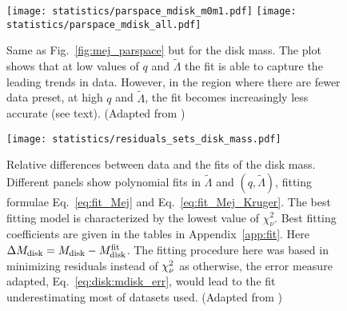 \begin{figure}[t]
    \centering 
    \texttt{[image: statistics/parspace\_mdisk\_m0m1.pdf]}
    \texttt{[image: statistics/parspace\_mdisk\_all.pdf]}
    \caption{
        Same as Fig.~\ref{fig:mej_parspace} but for the disk mass.
        The plot shows that at low values of $q$ and $\tilde{\Lambda}$ the fit 
        is able to capture the leading trends in data. However, in the region where 
        there are fewer data preset, at high $q$ and $\tilde{\Lambda}$, the fit 
        becomes increasingly less accurate (see text).
        (Adapted from \citet{Nedora:2020qtd})
    }
    \label{fig:mdisk_parspace}
\end{figure}
%
\begin{figure}[t]
    \centering 
    \texttt{[image: statistics/residuals\_sets\_disk\_mass.pdf]}
    \caption{
        Relative differences between data and the fits of the disk mass. 
        Different panels show polynomial fits in $\tilde{\Lambda}$ and $(q,\tilde{\Lambda})$, fitting formulae Eq.~\eqref{eq:fit_Mej} and Eq.~\eqref{eq:fit_Mej_Kruger}. 
        The best fitting model is characterized by the lowest value of $\chi_{\nu}^2$.
        Best fitting coefficients are given in the tables in Appendix~\ref{app:fit}.
        Here $\Delta M_{\rm disk} = M_{\rm disk} - M^{\rm fit}_{\rm disk}$.
        The fitting procedure here was based in minimizing residuals instead of $\chi_{\nu}^2$ as otherwise, the error measure adapted, Eq.~\eqref{eq:disk:mdisk_err}, would lead to the 
        fit underestimating most of datasets used.
        (Adapted from \citet{Nedora:2020qtd})
    }
    \label{fig:stat_mdisk}
\end{figure}

 

